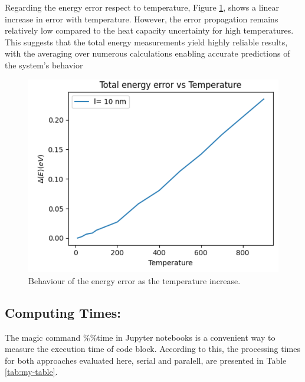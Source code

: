\documentclass[%
 reprint,
 amsmath,amssymb,
 aps,
]{revtex4-2}
\begin{document}
    Regarding the energy error respect to temperature, Figure \ref{fig:errorenergy}, shows a linear increase in error with temperature. However, the error propagation remains relatively low compared to the heat capacity uncertainty for high temperatures. This suggests that the total energy measurements yield highly reliable results, with the averaging over numerous calculations enabling accurate predictions of the system's behavior
            
    \begin{figure}[!h]
         \centering
         \includegraphics[width=0.7\linewidth]{ERRORENERGY.png}
        \caption{Behaviour of the energy error as the temperature increase.}
        \label{fig:errorenergy}
    \end{figure}
\subsection{Computing Times:}
The magic command \%\%time in Jupyter notebooks is a convenient way to measure the execution time of code block. According to this, the processing times for both approaches evaluated here, serial and paralell, are presented in Table \ref{tab:my-table}.

\begin{table}[!h]
\centering
{}
\caption{}
\label{tab:my-table}
\end{table}
\end{document}
